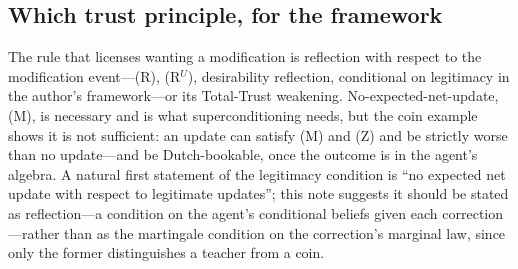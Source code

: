 \documentclass[11pt,a4paper]{article}
\begin{document}
\subsection{Which trust principle, for the framework}
The rule that licenses wanting a modification is reflection with respect to the modification event---(R), (R$^U$), desirability reflection, conditional on legitimacy in the author's framework---or its Total-Trust weakening. No-expected-net-update, (M), is necessary and is what superconditioning needs, but the coin example shows it is not sufficient: an update can satisfy (M) and (Z) and be strictly worse than no update---and be Dutch-bookable, once the outcome is in the agent's algebra. A natural first statement of the legitimacy condition is ``no expected net update with respect to legitimate updates''; this note suggests it should be stated as reflection---a condition on the agent's conditional beliefs given each correction---rather than as the martingale condition on the correction's marginal law, since only the former distinguishes a teacher from a coin.
\end{document}
